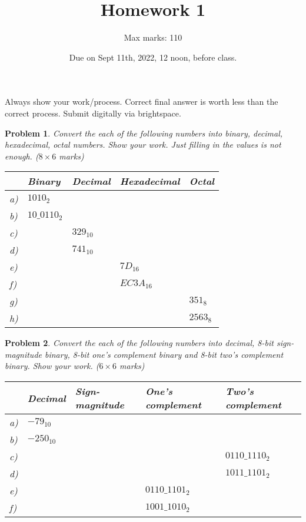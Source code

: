 \documentclass{article}
\title{Homework 1}
\author{Max marks: 110}
\date{Due on Sept 11th, 2022, 12 noon, before class. }
\newtheorem{prob}{Problem}
\begin{document}
\maketitle
Always show your work/process. Correct final answer is worth less than the
correct process. Submit digitally via brightspace.

\begin{prob}
  Convert the each of the following numbers into binary, decimal, hexadecimal,
octal numbers. Show your work. Just filling in the values is not enough. ($8 \times 6 $ marks)

  \begin{tabular}{lllll}
    \toprule
     & Binary & Decimal & Hexadecimal & Octal \\
    \midrule
    a)& $1010_2$     &   &   &    \\
    b)& $10\_0110_2$ &   &   &   \\
    c)&   & $329_{10}$   &   &   \\
    d)&   & $741_{10}$   &   &   \\
    e)&   &   & $7D_{16}$    &   \\
    f)&   &   & $EC3A_{16}$  &   \\
    g)&   &   &   & $351_8$\\
    h)&   &   &   & $2563_8$\\
    \bottomrule
  \end{tabular}
\end{prob}

\vspace{20em}

\begin{prob}
  Convert the each of the following numbers into decimal, 8-bit sign-magnitude binary,
  8-bit one's complement binary and 8-bit two's complement binary. Show your work. ($6 \times 6 $ marks)

  \begin{tabular}{lllll}
    \toprule
    & Decimal & Sign-magnitude & One's complement & Two's complement \\
    \midrule
    a) & $-79_{10}$ & & & \\
    b) & $-250_{10}$ & & & \\
    c) & & & & $0110\_1110_2$ \\
    d) & &  & & $1011\_1101_2$\\
    e) & & & $0110\_1101_2$&  \\
    f) & &  & $1001\_1010_2$& \\
    \bottomrule
  \end{tabular}
\end{prob}
\end{document}
